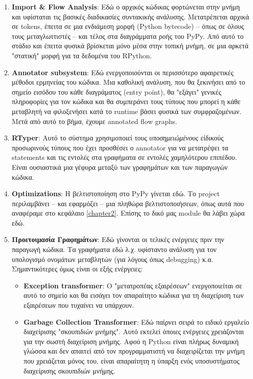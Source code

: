 \begin{enumerate}

\item \textbf{Import \& Flow Analysis}: Εδώ ο αρχικός κώδικας φορτώνεται στην
μνήμη και υφίσταται τις βασικές διαδικασίες συντακικής ανάλυσης. Μετατρέπεται
αρχικά σε tokens, έπειτα σε μια ενδιάμεση μορφή (Python bytecode) – όπως σε
όλους τους μεταγλωττιστές – και τέλος στα διαγράμματα ροής του PyPy. Από αυτό
το στάδιο και έπειτα φυσικά βρίσκεται μόνο μέσα στην τοπική μνήμη, σε μια 
αρκετά "στατική" μορφή για τα δεδομένα του RPython.

\item \textbf{Annotator subsystem}: Εδώ ενεργοποιούνται οι περισσότερο
αφαιρετικές μέθοδοι ερμηνείας του κώδικα. Μια καθολική ανάλυση, που θα 
ξεκινήσει από το σημείο εισόδου του κάθε διαγράματος (entry point), θα "εξάγει"
γενικές πληροφορίες για τον κώδικα και θα συμπεράνει τους τύπους που μπορεί η 
κάθε μεταβλητή να φιλοξενήσει κατά το runtime βάσει φυσικά των συμφραζομένων.
Μετά από αυτό το βήμα, έχουμε annotated flow graphs.

\item \textbf{RTyper}: Αυτό το σύστημα χρησιμοποιεί τους
\textit{υποσημειώμένους} είδικούς προσωρινούς τύπους που έχει προσθέσει ο
annotator για να μετατρέψει τα statements και τις εντολές στα γραφήματα σε
εντολές χαμηλότερου επιπέδου. Είναι ουσιαστικά μια γέφυρα μεταξύ των γραφημάτων
και των παραγωγών κώδικα.

\item \textbf{Optimizations}: Η βελτιστοποίηση στο PyPy γίνεται εδώ. Το project
περιλαμβάνει – και εφαρμόζει –  μια πληθώρα βελτιστοποιήσεων, όπως αυτά που
αναφέραμε στο κεφάλαιο \ref{chapter2}. Επίσης το δικό μας module θα λάβει χώρα
εδώ.

\item \textbf{Προετοιμασία Γραφημάτων}: Εδώ γίνονται οι τελικές ενέργειες πριν
την παραγωγή κώδικα. Τα γραφήματα εδώ λ.χ. υφίσταντο ανάλυση για τον υπολογισμό
ονομάτων μεταβλητών (για λόγους όπως debugging) κ.α. Σημαντικότερες όμως είναι
οι εξής ενέργειες:

\begin{itemize}

\item \textbf{Exception transformer}: Ο "μετατροπέας εξαιρέσεων" ενεργοποιείται
σε αυτό το σημείο και θα εισάγει τον απαραίτητο κώδικα για τη διαχείριση των
εξαιρέσεων που τυχαίνει να υπάρχουν.

\item \textbf{Garbage Collection Transformer}: Εδώ παίρνει σειρά το ειδικό
εργαλείο διαχείρισης "σκουπιδιών μνήμης". Αυτό εκτελεί όποιες ενέργειες
χρειάζονται για την σωστή διαχείριση μνήμης. Αφού η Python είναι πλήρως 
δυναμική γλώσσα και δεν απαιτεί από τον προγραμματιστή να διαχειρίζεται την 
μνήμη που χρειάζεται μόνος του, είναι απαραίτητη η ύπαρξη ενός υποσυστήματος
διαχείρισης σκουπιδιών μνήμης.


\end{itemize}
\end{enumerate}
